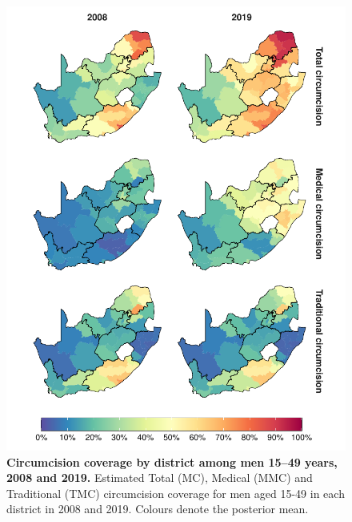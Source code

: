 \documentclass{article}
\begin{document}
\begin{figure}[H]
  \centering
  \includegraphics[width = 5.2in]{Figures/paper/Figure5.pdf}
  \caption{{\bf Circumcision coverage by district among men 15--49 years, 2008 and 2019.}
    Estimated Total (MC), Medical (MMC) and Traditional (TMC) circumcision coverage for men aged 15-49 in each district in 2008 and 2019. Colours denote the posterior mean.}
  \label{fig::district1549prevmap}
\end{figure}

\end{document}
